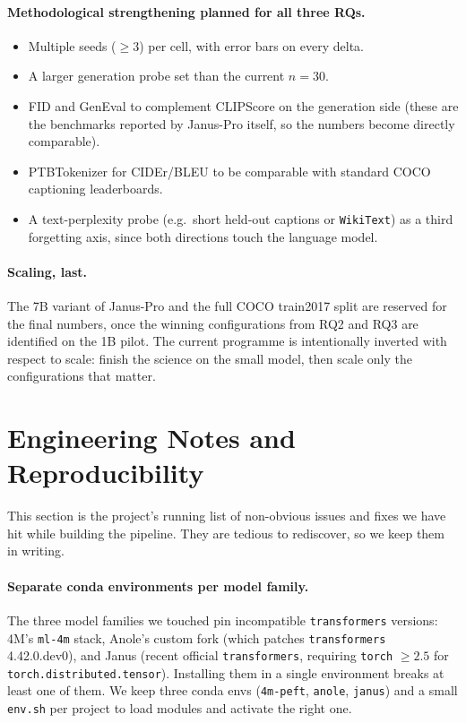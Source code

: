 \paragraph{Methodological strengthening planned for all three RQs.}
\begin{itemize}
    \item Multiple seeds ($\geq 3$) per cell, with error bars on every delta.
    \item A larger generation probe set than the current $n=30$.
    \item FID and GenEval to complement CLIPScore on the generation side
          (these are the benchmarks reported by Janus-Pro itself, so the
          numbers become directly comparable).
    \item PTBTokenizer for CIDEr/BLEU to be comparable with standard COCO
          captioning leaderboards.
    \item A text-perplexity probe (e.g.\ short held-out captions or
          \texttt{WikiText}) as a third forgetting axis, since both
          directions touch the language model.
\end{itemize}

\paragraph{Scaling, last.} The 7B variant of Janus-Pro and the full COCO
train2017 split are reserved for the final numbers, once the winning
configurations from RQ2 and RQ3 are identified on the 1B pilot.
The current programme is intentionally inverted with respect to scale:
finish the science on the small model, then scale only the configurations
that matter.

\section{Engineering Notes and Reproducibility}
\label{sec:eng_notes}

This section is the project's running list of non-obvious issues and fixes
we have hit while building the pipeline. They are tedious to rediscover, so
we keep them in writing.

\paragraph{Separate conda environments per model family.} The three model
families we touched pin incompatible \texttt{transformers} versions:
4M's \texttt{ml-4m} stack, Anole's custom fork (which patches
\texttt{transformers} 4.42.0.dev0), and Janus (recent official
\texttt{transformers}, requiring \texttt{torch} $\geq 2.5$ for
\texttt{torch.distributed.tensor}). Installing them in a single environment
breaks at least one of them. We keep three conda envs (\texttt{4m-peft},
\texttt{anole}, \texttt{janus}) and a small \texttt{env.sh} per project to
load modules and activate the right one.

